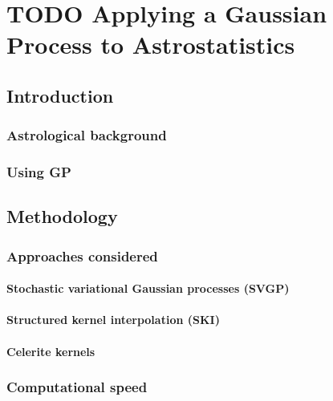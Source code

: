 \section{TODO Applying a Gaussian Process to Astrostatistics}
% 
% 
% 
% 
% 
% 
% 
% 


\subsection{Introduction}

\subsubsection{Astrological background \cite{galaxy-spectra-101}}

\subsubsection{Using GP \cite{galaxy-gp-noise}}

\subsection{Methodology}
\subsubsection{Approaches considered}

\paragraph{Stochastic variational Gaussian processes (SVGP) \cite{svgp}}

\paragraph{Structured kernel interpolation (SKI) \cite{ski}}

\paragraph{Celerite kernels \cite{foreman-mackay}}

\subsubsection{Computational speed}

